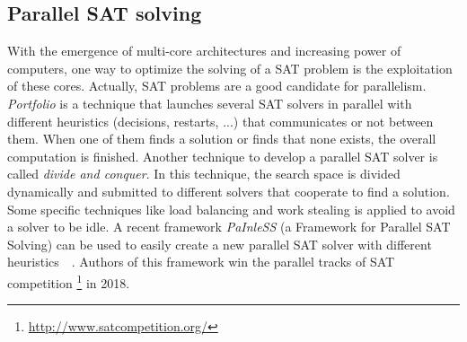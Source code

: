 \subsection{Parallel SAT solving}
With the emergence of multi-core architectures and increasing power of computers, one way to optimize the solving
of a SAT problem is the exploitation of these cores. Actually, SAT problems are a good candidate for parallelism.
\emph{Portfolio} is a technique that launches several SAT solvers in parallel with different heuristics (decisions, restarts, ...) that 
communicates or not between them. When one of them finds a solution or finds that none exists, the overall computation is finished.
Another technique to develop a parallel SAT solver is called \emph{divide and conquer}. In this technique,
the search space is divided  dynamically and submitted to different solvers that cooperate to find a solution.
 Some specific techniques like load balancing and work stealing is applied to avoid a solver to be idle.
A recent framework \emph{PaInleSS} (a Framework for Parallel SAT Solving) can be used to easily create a new parallel 
SAT solver with different heuristics~\cite{le2017painless}~\cite{le2019modular}. Authors of this framework win the parallel 
tracks of SAT competition \footnote{\url{http://www.satcompetition.org/}} in 2018.

%
